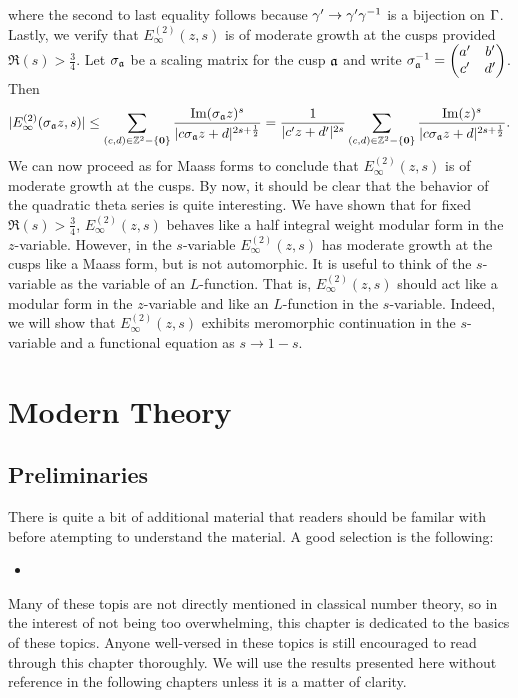 \documentclass[12pt,oneside]{book}
\begin{document}
      where the second to last equality follows because $\gamma' \to \gamma'\gamma^{-1}$ is a bijection on $\Gamma$. Lastly, we verify that $E_{\infty}^{(2)}(z,s)$ is of moderate growth at the cusps provided $\Re(s) > \frac{3}{4}$. Let $\sigma_{\mathfrak{a}}$ be a scaling matrix for the cusp $\mathfrak{a}$ and write $\sigma_{\mathfrak{a}}^{-1} = \begin{pmatrix} a' & b' \\ c' & d' \end{pmatrix}$. Then
      \[
        |E_{\infty}^{(2)}(\sigma_{\mathfrak{a}}z,s)| \le \sum_{(c,d) \in \mathbb{Z}^{2}-\{\mathbf{0}\}}\frac{\mathrm{Im}(\sigma_{\mathfrak{a}}z)^{s}}{|c\sigma_{\mathfrak{a}}z+d|^{2s+\frac{1}{2}}} = \frac{1}{|c'z+d'|^{2s}}\sum_{(c,d) \in \mathbb{Z}^{2}-\{\mathbf{0}\}}\frac{\mathrm{Im}(z)^{s}}{|c\sigma_{\mathfrak{a}}z+d|^{2s+\frac{1}{2}}}.
      \]
      We can now proceed as for Maass forms to conclude that $E_{\infty}^{(2)}(z,s)$ is of moderate growth at the cusps. By now, it should be clear that the behavior of the quadratic theta series is quite interesting. We have shown that for fixed $\Re(s) > \frac{3}{4}$, $E_{\infty}^{(2)}(z,s)$ behaves like a half integral weight modular form in the $z$-variable. However, in the $s$-variable $E_{\infty}^{(2)}(z,s)$ has moderate growth at the cusps like a Maass form, but is not automorphic. It is useful to think of the $s$-variable as the variable of an $L$-function. That is, $E_{\infty}^{(2)}(z,s)$ should act like a modular form in the $z$-variable and like an $L$-function in the $s$-variable. Indeed, we will show that $E_{\infty}^{(2)}(z,s)$ exhibits meromorphic continuation in the $s$-variable and a functional equation as $s \to 1-s$.
    \section{}
\part{Modern Theory}
  \chapter{Preliminaries}
    There is quite a bit of additional material that readers should be familar with before atempting to understand the material. A good selection is the following:
    \begin{itemize}
      \item {}
    \end{itemize}
    Many of these topis are not directly mentioned in classical number theory, so in the interest of not being too overwhelming, this chapter is dedicated to the basics of these topics. Anyone well-versed in these topics is still encouraged to read through this chapter thoroughly. We will use the results presented here without reference in the following chapters unless it is a matter of clarity.
\end{document}
